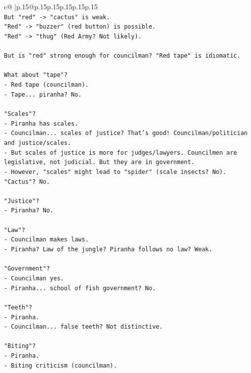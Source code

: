 \documentclass{article}
\begin{document}
{\begin{supertabular}{c@{$\;$}|p{.15\linewidth}@{}p{.15\linewidth}p{.15\linewidth}p{.15\linewidth}p{.15\linewidth}p{.15\linewidth}}
{{{\\ 
\texttt{But "red" {-}> "cactus" is weak.} \\
\texttt{"Red" {-}> "buzzer" (red button) is possible.} \\
\texttt{"Red" {-}> "thug" (Red Army? Not likely).} \\
\\ 
\texttt{But is "red" strong enough for councilman? "Red tape" is idiomatic.} \\
\\ 
\texttt{What about "tape"?} \\
\texttt{{-} Red tape (councilman).} \\
\texttt{{-} Tape... piranha? No.} \\
\\ 
\texttt{"Scales"?} \\
\texttt{{-} Piranha has scales.} \\
\texttt{{-} Councilman... scales of justice? That's good! Councilman/politician and justice/scales.} \\
\texttt{{-} But scales of justice is more for judges/lawyers. Councilmen are legislative, not judicial. But they are in government.} \\
\texttt{{-} However, "scales" might lead to "spider" (scale insects? No). "Cactus"? No.} \\
\\ 
\texttt{"Justice"?} \\
\texttt{{-} Piranha? No.} \\
\\ 
\texttt{"Law"?} \\
\texttt{{-} Councilman makes laws.} \\
\texttt{{-} Piranha? Law of the jungle? Piranha follows no law? Weak.} \\
\\ 
\texttt{"Government"?} \\
\texttt{{-} Councilman yes.} \\
\texttt{{-} Piranha... school of fish government? No.} \\
\\ 
\texttt{"Teeth"?} \\
\texttt{{-} Piranha.} \\
\texttt{{-} Councilman... false teeth? Not distinctive.} \\
\\ 
\texttt{"Biting"?} \\
\texttt{{-} Piranha.} \\
\texttt{{-} Biting criticism (councilman).} \\
}}}
\end{supertabular}}
\end{document}
